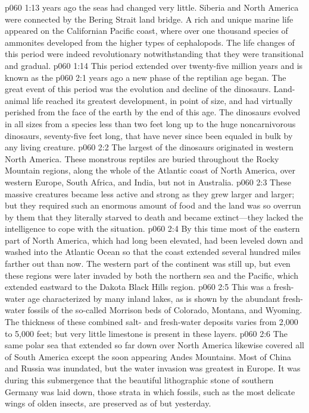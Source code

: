 \pc \vs p060 1:13  years ago the seas had changed very little. Siberia and North America were connected by the Bering Strait land bridge. A rich and unique marine life appeared on the Californian Pacific coast, where over one thousand species of ammonites developed from the higher types of cephalopods. The life changes of this period were indeed revolutionary notwithstanding that they were transitional and gradual.
\pc \vs p060 1:14 This period extended over twenty\hyp{}five million years and is known as the \plusone
{}
\vs p060 2:1  years ago a new phase of the reptilian age began. The great event of this period was the evolution and decline of the dinosaurs. Land\hyp{}animal life reached its greatest development, in point of size, and had virtually perished from the face of the earth by the end of this age. The dinosaurs evolved in all sizes from a species less than two feet long up to the huge noncarnivorous dinosaurs, seventy\hyp{}five feet long, that have never since been equaled in bulk by any living creature.
\vs p060 2:2 The largest of the dinosaurs originated in western North America. These monstrous reptiles are buried throughout the Rocky Mountain regions, along the whole of the Atlantic coast of North America, over western Europe, South Africa, and India, but not in Australia.
\vs p060 2:3 These massive creatures became less active and strong as they grew larger and larger; but they required such an enormous amount of food and the land was so overrun by them that they literally starved to death and became extinct---they lacked the intelligence to cope with the situation.
\vs p060 2:4 By this time most of the eastern part of North America, which had long been elevated, had been leveled down and washed into the Atlantic Ocean so that the coast extended several hundred miles farther out than now. The western part of the continent was still up, but even these regions were later invaded by both the northern sea and the Pacific, which extended eastward to the Dakota Black Hills region.
\vs p060 2:5 This was a fresh\hyp{}water age characterized by many inland lakes, as is shown by the abundant fresh\hyp{}water fossils of the so\hyp{}called Morrison beds of Colorado, Montana, and Wyoming. The thickness of these combined salt\hyp{} and fresh\hyp{}water deposits varies from 2,000 to 5,000 feet; but very little limestone is present in these layers.
\vs p060 2:6 The same polar sea that extended so far down over North America likewise covered all of South America except the soon appearing Andes Mountains. Most of China and Russia was inundated, but the water invasion was greatest in Europe. It was during this submergence that the beautiful lithographic stone of southern Germany was laid down, those strata in which fossils, such as the most delicate wings of olden insects, are preserved as of but yesterday.
